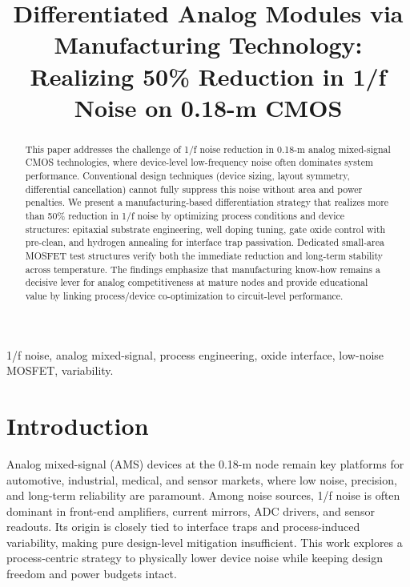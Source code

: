 \documentclass[conference]{IEEEtran}
\title{Differentiated Analog Modules via Manufacturing Technology:\\
Realizing 50\% Reduction in 1/f Noise on 0.18-\textmu m CMOS}
\author{
\IEEEauthorblockN{Shinichi Samizo}
\IEEEauthorblockA{Independent Semiconductor Researcher\\
Project Design Hub, Samizo-AITL\\
\textit{Email:} \href{mailto:shin3t72@gmail.com}{shin3t72@gmail.com}\quad
\textit{GitHub:} \href{https://github.com/Samizo-AITL}{Samizo-AITL}}
}
\begin{document}
\maketitle

\begin{abstract}
This paper addresses the challenge of 1/f noise reduction in 0.18-\textmu m analog mixed-signal CMOS technologies, where device-level low-frequency noise often dominates system performance. Conventional design techniques (device sizing, layout symmetry, differential cancellation) cannot fully suppress this noise without area and power penalties. We present a manufacturing-based differentiation strategy that realizes more than 50\% reduction in 1/f noise by optimizing process conditions and device structures: epitaxial substrate engineering, well doping tuning, gate oxide control with pre-clean, and hydrogen annealing for interface trap passivation. Dedicated small-area MOSFET test structures verify both the immediate reduction and long-term stability across temperature. The findings emphasize that manufacturing know-how remains a decisive lever for analog competitiveness at mature nodes and provide educational value by linking process/device co-optimization to circuit-level performance.
\end{abstract}

\begin{IEEEkeywords}
1/f noise, analog mixed-signal, process engineering, oxide interface, low-noise MOSFET, variability.
\end{IEEEkeywords}

\section{Introduction}
Analog mixed-signal (AMS) devices at the 0.18-\textmu m node remain key platforms for automotive, industrial, medical, and sensor markets, where low noise, precision, and long-term reliability are paramount. Among noise sources, 1/f noise is often dominant in front-end amplifiers, current mirrors, ADC drivers, and sensor readouts. Its origin is closely tied to interface traps and process-induced variability, making pure design-level mitigation insufficient. This work explores a process-centric strategy to physically lower device noise while keeping design freedom and power budgets intact.

\end{document}
